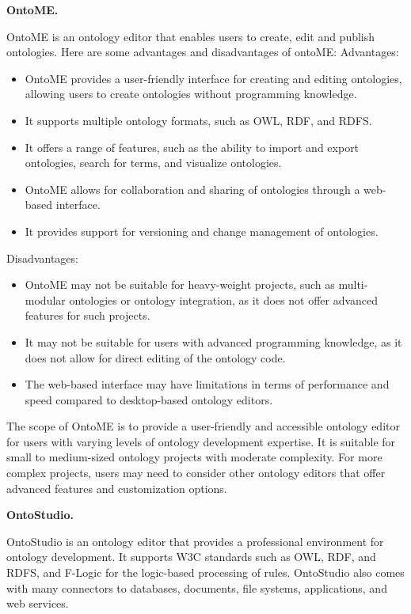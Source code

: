 \documentclass[a4paper,10pt,twocolumn]{article}
\begin{document}
\textbf{OntoME.}

OntoME is an ontology editor that enables users
to create, edit and publish ontologies. Here are some
advantages and disadvantages of ontoME:
Advantages:
\begin{itemize}
	\item{OntoME provides a user-friendly interface for creating
	and editing ontologies, allowing users to create
	ontologies without programming knowledge.}
	\item{It supports multiple ontology formats, such as OWL,
	RDF, and RDFS.}
	\item{It offers a range of features, such as the ability to
	import and export ontologies, search for terms, and
	visualize ontologies.}
	\item{OntoME allows for collaboration and sharing of
	ontologies through a web-based interface.}
	\item{It provides support for versioning and change management
	of ontologies.}
\end{itemize}

Disadvantages:
\begin{itemize}
	\item{OntoME may not be suitable for heavy-weight
	projects, such as multi-modular ontologies or ontology
	integration, as it does not offer advanced
	features for such projects.}
	\item{It may not be suitable for users with advanced
	programming knowledge, as it does not allow for
	direct editing of the ontology code.}
	\item{The web-based interface may have limitations in
	terms of performance and speed compared to
	desktop-based ontology editors.}
\end{itemize}

The scope of OntoME is to provide a user-friendly and
accessible ontology editor for users with varying levels
of ontology development expertise. It is suitable for
small to medium-sized ontology projects with moderate
complexity. For more complex projects, users may need
to consider other ontology editors that offer advanced
features and customization options.

\textbf{OntoStudio.}

OntoStudio is an ontology editor that provides a
professional environment for ontology development. It
supports W3C standards such as OWL, RDF, and RDFS,
and F-Logic for the logic-based processing of rules. OntoStudio
also comes with many connectors to databases,
documents, file systems, applications, and web services.
\end{document}
